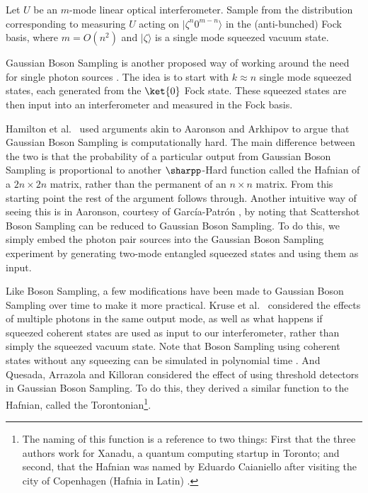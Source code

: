 \begin{problem} Let $U$ be an $m$-mode linear optical interferometer. Sample from the distribution corresponding to measuring $U$ acting on $|\zeta^n0^{m-n}\rangle$ in the (anti-bunched) Fock basis, where $m=O(n^2)$ and $|\zeta\rangle$ is a single mode squeezed vacuum state.
\end{problem}

Gaussian Boson Sampling is another proposed way of working around the need for single photon sources \cite{hamilton2017}. The idea is to start with $k\approx n$ single mode squeezed states, each generated from the $\ket{0}$ Fock state. These squeezed states are then input into an interferometer and measured in the Fock basis.

Hamilton et al.~\cite{hamilton2017} used arguments akin to Aaronson and Arkhipov to argue that Gaussian Boson Sampling is computationally hard. The main difference between the two is that the probability of a particular output from Gaussian Boson Sampling is proportional to another $\sharpp$-Hard function called the Hafnian of a $2n\times 2n$ matrix, rather than the permanent of an $n\times n$ matrix. From this starting point the rest of the argument follows through. Another intuitive way of seeing this is in Aaronson, courtesy of Garc\'{i}a-Patr\'{o}n \cite{aaronson2013}, by noting that Scattershot Boson Sampling can be reduced to Gaussian Boson Sampling. To do this, we simply embed the photon pair sources into the Gaussian Boson Sampling experiment by generating two-mode entangled squeezed states and using them as input.

Like Boson Sampling, a few modifications have been made to Gaussian Boson Sampling over time to make it more practical. Kruse et al.\ \cite{kruse2019} considered the effects of multiple photons in the same output mode, as well as what happens if squeezed coherent states are used as input to our interferometer, rather than simply the squeezed vacuum state. Note that Boson Sampling using coherent states without any squeezing can be simulated in polynomial time \cite{garciapatron2017}. And Quesada, Arrazola and Killoran \cite{quesada2018} considered the effect of using threshold detectors in Gaussian Boson Sampling. To do this, they derived a similar function to the Hafnian, called the Torontonian\footnote{The naming of this function is a reference to two things: First that the three authors work for Xanadu, a quantum computing startup in Toronto; and second, that the Hafnian was named by Eduardo Caianiello after visiting the city of Copenhagen (Hafnia in Latin) \cite{guerra2006}.}. 

